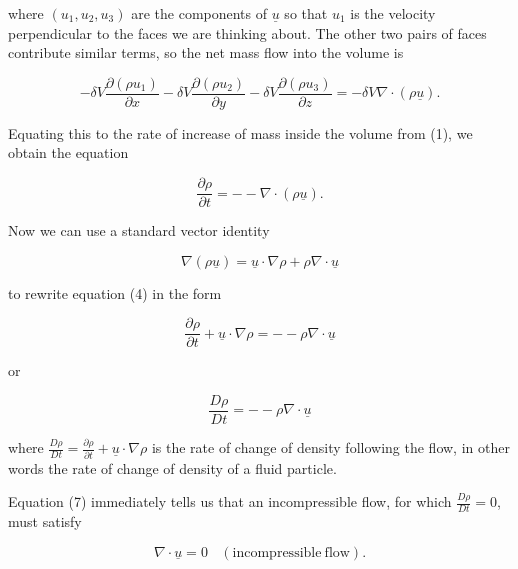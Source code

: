   \noindent{}where $(u_1,u_2,u_3)$ are the components of $\underline{u}$ so 
  that $u_1$ is the velocity perpendicular to the faces we are thinking about. 
  The other two pairs of faces contribute similar terms, so the net mass flow 
  into the volume is 

  \begin{equation*}-\delta V \dfrac{\partial (\rho u_1)}{\partial x} -\delta V 
  \dfrac{\partial (\rho u_2)}{\partial y} -\delta V \dfrac{\partial (\rho 
  u_3)}{\partial z} = -\delta V \nabla \cdot (\rho \underline{u}) . 
  \tag{3}\end{equation*} 

  Equating this to the rate of increase of mass inside the volume from (1), we 
  obtain the equation 

  \begin{equation*}\dfrac{\partial \rho}{\partial t} = -- \nabla \cdot (\rho 
  \underline{u}) . \tag{4}\end{equation*} 

  Now we can use a standard vector identity 

  \begin{equation*}\nabla (\rho \underline{u}) = \underline{u} \cdot \nabla 
  \rho + \rho \nabla \cdot \underline{u}\tag{5}\end{equation*} 

  \noindent{}to rewrite equation (4) in the form 

  \begin{equation*}\dfrac{\partial \rho}{\partial t} + \underline{u} \cdot 
  \nabla \rho = -- \rho \nabla \cdot \underline{u}\tag{6}\end{equation*} 

  \noindent{}or 

  \begin{equation*}\dfrac{D \rho}{D t} = -- \rho \nabla \cdot 
  \underline{u}\tag{7}\end{equation*} 

  \noindent{}where $\frac{D\rho}{Dt} = \frac{\partial \rho}{\partial t} + 
  \underline{u} \cdot \nabla \rho$ is the rate of change of density following 
  the flow, in other words the rate of change of density of a fluid particle. 

  Equation (7) immediately tells us that an incompressible flow, for which 
  $\frac{D\rho}{Dt} =0$, must satisfy 

  \begin{equation*}\nabla \cdot \underline{u} = 0 
  \mathrm{~~~~(incompressible~flow)} . \tag{8}\end{equation*} 


